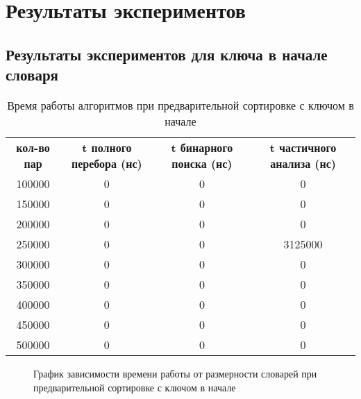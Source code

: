 \section{Результаты экспериментов}

\newpage
\subsection{Результаты экспериментов для ключа в начале словаря}

\begin{table}[ph!]
  \begin{center}
    \captionsetup{justification=raggedright}
     \caption{Время работы алгоритмов при предварительной сортировке с ключом в начале}
    \label{tab:workcost_classic}
    \begin{tabular}{c|c|c|c}
      \textbf{кол-во пар} & \textbf{t полного перебора (нс)}  & \textbf{t бинарного поиска (нс)} & \textbf{t частичного анализа (нс)}\\
	100000 & 0 & 0 & 0\\
	150000 & 0 & 0 & 0\\       
	200000 & 0 & 0 & 0\\       
	250000 & 0 & 0 & 3125000\\ 
	300000 & 0 & 0 & 0\\       
	350000 & 0 & 0 & 0\\       
	400000 & 0 & 0 & 0\\       
	450000 & 0 & 0 & 0\\       
	500000 & 0 & 0 & 0\\ 
      \hline	
    \end{tabular}
  \end{center}
\end{table}

\begin{figure}[ph!]
	\caption{График зависимости времени работы от размерности словарей при предварительной сортировке с ключом в начале}
\end{figure}

